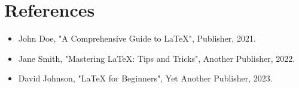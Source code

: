 
\section{References}

\begin{itemize}
    \item John Doe, "A Comprehensive Guide to LaTeX", Publisher, 2021.
    \item Jane Smith, "Mastering LaTeX: Tips and Tricks", Another Publisher, 2022.
    \item David Johnson, "LaTeX for Beginners", Yet Another Publisher, 2023.
\end{itemize}